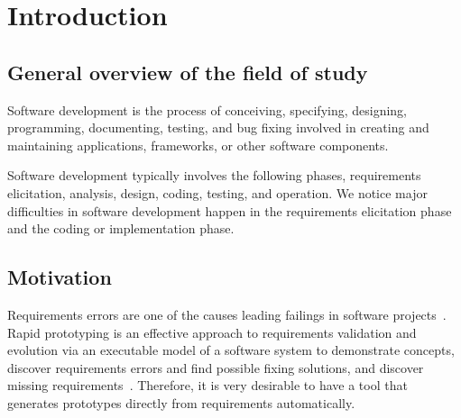 \chapter{Introduction}



\section{General overview of the field of study}
Software development is the process of conceiving, specifying, designing, programming, documenting, testing, and bug fixing involved in creating and maintaining applications, frameworks, or other software components.

Software development typically involves the following phases, requirements elicitation, analysis, design, coding, testing, and operation. We notice major difficulties in software development happen in the requirements elicitation phase and the coding or implementation phase.

\section{Motivation}

Requirements errors are one of the causes leading failings in software projects~\cite{sutcliffe1999tracing}.
Rapid prototyping is an effective approach to requirements validation and evolution via an executable model of a software system to demonstrate concepts, discover requirements errors and find possible fixing solutions, and discover missing requirements~\cite{kordon2002introduction}.
Therefore, it is very desirable to have a tool that generates prototypes directly from requirements automatically.


